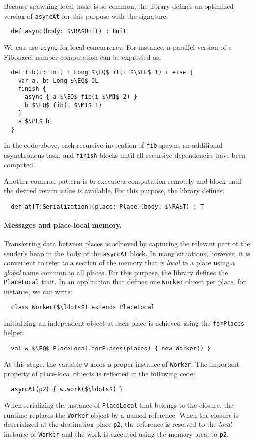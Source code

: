 Because spawning local tasks is so common, the library defines an optimized version of
\lstinline{asyncAt} for this purpose with the signature:
\begin{lstlisting}
  def async(body: $\RA$Unit) : Unit
\end{lstlisting}
We can use \lstinline{async} for local concurrency. For instance, a parallel
version of a Fibonacci number computation can be expressed as:
\begin{lstlisting}
  def fib(i: Int) : Long $\EQ$ if(i $\SLE$ 1) i else {
    var a, b: Long $\EQ$ 0L
    finish {
      async { a $\EQ$ fib(i $\MI$ 2) }
      b $\EQ$ fib(i $\MI$ 1)
    }
    a $\PL$ b
  }
\end{lstlisting}
In the code above, each recursive invocation of \lstinline{fib} spawns an
additional asynchronous task, and \lstinline{finish} blocks until all
recursive dependencies have been computed.

Another common pattern is to execute a computation remotely and block until the
desired return value is available. For this purpose, the library defines:
\begin{lstlisting}
  def at[T:Serialization](place: Place)(body: $\RA$T) : T
\end{lstlisting}

\paragraph{Messages and place-local memory.}
Transferring data between places is achieved by capturing the relevant part of
the sender's heap in the body of the \lstinline{asyncAt} block. In many
situations, however, it is convenient to refer to a section of the memory that
is \emph{local} to a place using a \emph{global} name common to all places. For this
purpose, the library defines the \lstinline{PlaceLocal} trait. In an
application that defines one \lstinline{Worker} object per place, for instance,
we can write:
\begin{lstlisting}
  class Worker($\ldots$) extends PlaceLocal
\end{lstlisting}
Initializing an independent object at each place is achieved using the
\lstinline{forPlaces} helper:
\begin{lstlisting}
  val w $\EQ$ PlaceLocal.forPlaces(places) { new Worker() }
\end{lstlisting}
At this stage, the variable \lstinline{w} holds a proper instance of
\lstinline{Worker}. The important property of place-local objects is reflected
in the following code:
\begin{lstlisting}
  asyncAt(p2) { w.work($\ldots$) }
\end{lstlisting}
When serializing the instance of \lstinline{PlaceLocal} that belongs to the
closure, the runtime replaces the \lstinline{Worker} object by a named
reference. When the closure is deserialized at the destination place
\lstinline{p2}, the reference is resolved to the \emph{local} instance of
\lstinline{Worker} and the work is executed using the memory local to
\lstinline{p2}.

